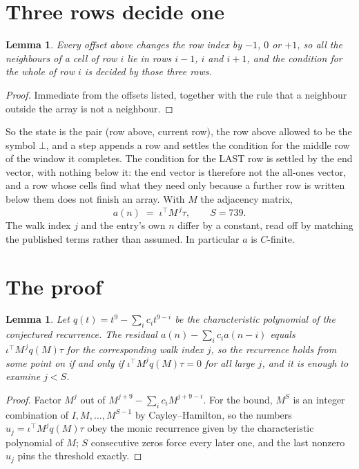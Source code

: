 \documentclass[11pt,a4paper]{article}
\theoremstyle{plain}
\newtheorem{lemma}[theorem]{Lemma}
\theoremstyle{definition}
\begin{document}
\section{Three rows decide one}

\begin{lemma}\label{lem:win}
Every offset above changes the row index by $-1$, $0$ or $+1$, so all the neighbours of a cell
of row $i$ lie in rows $i-1$, $i$ and $i+1$, and the condition for the whole of row $i$ is
decided by those three rows.
\end{lemma}

\begin{proof}
Immediate from the offsets listed, together with the rule that a neighbour outside the array is
not a neighbour.
\end{proof}

So the state is the pair (row above, current row), the row above allowed to be the symbol
$\bot$, and a step appends a row and settles the condition for the middle row of the window it
completes. The condition for the LAST row is settled by the end vector, with nothing below it:
the end vector is therefore not the all-ones vector, and a row whose cells find what they need
only because a further row is written below them does not finish an array. With $M$ the
adjacency matrix,
\[
a(n)\;=\;\iota^{\!\top}M^{\,j}\tau ,\qquad S=739.
\]
The walk index $j$ and the entry's own $n$ differ by a constant, read off by matching the
published terms rather than assumed. In particular $a$ is $C$-finite.

\section{The proof}

\begin{lemma}\label{lem:crit}
Let $q(t)=t^{9}-\sum_i c_it^{9-i}$ be the characteristic polynomial of the
conjectured recurrence. The residual $a(n)-\sum_ic_ia(n-i)$ equals
$\iota^{\!\top}M^{\,j}q(M)\tau$ for the corresponding walk index $j$, so the recurrence
holds from some point on if and only if $\iota^{\!\top}M^{j}q(M)\tau=0$ for all large $j$,
and it is enough to examine $j<S$.
\end{lemma}

\begin{proof}
Factor $M^{j}$ out of $M^{j+9}-\sum_ic_iM^{j+9-i}$. For the bound, $M^{S}$
is an integer combination of $I,M,\dots,M^{S-1}$ by Cayley--Hamilton, so the numbers
$u_j=\iota^{\!\top}M^{j}q(M)\tau$ obey the monic recurrence given by the characteristic
polynomial of $M$; $S$ consecutive zeros force every later one, and the last nonzero $u_j$
pins the threshold exactly.
\end{proof}
\end{document}
